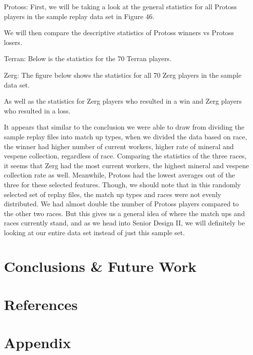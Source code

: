 \documentclass[a4paper,12pt]{report}
\begin{document}
Protoss:
First, we will be taking a look at the general statistics for all Protoss players in the sample replay data set in Figure 46. 

We will then compare the descriptive statistics of Protoss winners vs Protoss losers. 


Terran:
Below is the statistics for the 70 Terran players. 


Zerg:
The figure below shows the statistics for all 70 Zerg players in the sample data set. 

As well as the statistics for Zerg players who resulted in a win and Zerg players who resulted in a loss. 

It appears that similar to the conclusion we were able to draw from dividing the sample replay files into match up types, when we divided the data based on race, the winner had higher number of current workers, higher rate of mineral and vespene collection, regardless of race. Comparing the statistics of the three races, it seems that Zerg had the most current workers, the highest mineral and vespene collection rate as well. Meanwhile, Protoss had the lowest averages out of the three for these selected features. Though, we should note that in this randomly selected set of replay files, the match up types and races were not evenly distributed. We had almost double the number of Protoss players compared to the other two races. But this gives us a general idea of where the match ups and races currently stand, and as we head into Senior Design II, we will definitely be looking at our entire data set instead of just this sample set.

\chapter{Conclusions \& Future Work}
\chapter{References}
\chapter{Appendix}
\end{document}
